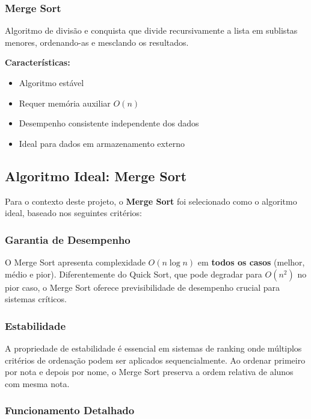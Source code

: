 \documentclass[conference]{IEEEtran}
\begin{document}
\subsubsection{Merge Sort}

Algoritmo de divisão e conquista que divide recursivamente a lista em sublistas menores, ordenando-as e mesclando os resultados.

\textbf{Características:}
\begin{itemize}
    \item Algoritmo estável
    \item Requer memória auxiliar $O(n)$
    \item Desempenho consistente independente dos dados
    \item Ideal para dados em armazenamento externo
\end{itemize}

\subsection{Algoritmo Ideal: Merge Sort}

Para o contexto deste projeto, o \textbf{Merge Sort} foi selecionado como o algoritmo ideal, baseado nos seguintes critérios:

\subsubsection{Garantia de Desempenho}

O Merge Sort apresenta complexidade $O(n \log n)$ em \textbf{todos os casos} (melhor, médio e pior). Diferentemente do Quick Sort, que pode degradar para $O(n^2)$ no pior caso, o Merge Sort oferece previsibilidade de desempenho crucial para sistemas críticos.

\subsubsection{Estabilidade}

A propriedade de estabilidade é essencial em sistemas de ranking onde múltiplos critérios de ordenação podem ser aplicados sequencialmente. Ao ordenar primeiro por nota e depois por nome, o Merge Sort preserva a ordem relativa de alunos com mesma nota.

\subsubsection{Funcionamento Detalhado}
\end{document}
